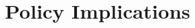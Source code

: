 \begin{comment}
\subfloat[]{\texttt{[image: templates/figures/GboxSensitivity/North Puno95th.png]}} &
\subfloat[]{\texttt{[image: templates/figures/GboxSensitivity/Arequipa95th.png]}}\\
\subfloat[]{\texttt{[image: templates/figures/GboxSensitivity/Apurimac95th.png]}}
\end{tabular}
\centering
\captionof{figure}{Sensitivity of Observations to Emission Changes in single grid box when the $95^{th}$ range is used as the metric to compare the observations to model outputs}
\label{fig:Histplots95th}
\end{figure}
\FloatBarrier

\begin{figure}[h]

\begin{tabular}[h]{cc}

\subfloat[]{\texttt{[image: templates/figures/GboxSensitivity/Madre de Diosiqr.png]}} &
\subfloat[]{\texttt{[image: templates/figures/GboxSensitivity/South Punoiqr.png]}}\\

\subfloat[]{\texttt{[image: templates/figures/GboxSensitivity/North Punoiqr.png]}} &
\subfloat[]{\texttt{[image: templates/figures/GboxSensitivity/Arequipaiqr.png]}}\\
\subfloat[]{\texttt{[image: templates/figures/GboxSensitivity/Apurimaciqr.png]}}
\end{tabular}
\centering
\captionof{figure}{Sensitivity of Observations to Emission Changes in single grid box when the interquartile range (IQR) is used as the metric to compare the observations to model outputs}
\label{fig:Histplotsiqr}
\end{figure}
\FloatBarrier
\end{comment}


\section{Policy Implications}

